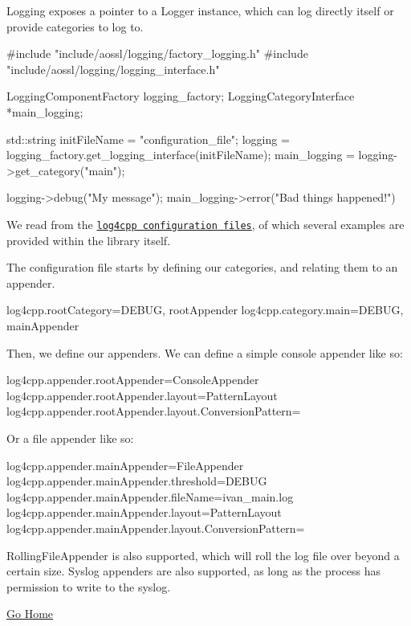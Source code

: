 Logging exposes a pointer to a Logger instance, which can log directly itself or provide categories to log to. \begin{DoxyVerb}#include "include/aossl/logging/factory_logging.h"
#include "include/aossl/logging/logging_interface.h"

LoggingComponentFactory logging_factory;
LoggingCategoryInterface *main_logging;

std::string initFileName = "configuration_file";
logging = logging_factory.get_logging_interface(initFileName);
main_logging = logging->get_category("main");

logging->debug("My message");
main_logging->error("Bad things happened!")
\end{DoxyVerb}


We read from the \href{http://log4cpp.sourceforge.net/api/classlog4cpp_1_1PropertyConfigurator.html}{\tt log4cpp configuration files}, of which several examples are provided within the library itself.

The configuration file starts by defining our categories, and relating them to an appender. \begin{DoxyVerb}log4cpp.rootCategory=DEBUG, rootAppender
log4cpp.category.main=DEBUG, mainAppender
\end{DoxyVerb}


Then, we define our appenders. We can define a simple console appender like so\+: \begin{DoxyVerb}log4cpp.appender.rootAppender=ConsoleAppender
log4cpp.appender.rootAppender.layout=PatternLayout
log4cpp.appender.rootAppender.layout.ConversionPattern=%
\end{DoxyVerb}


Or a file appender like so\+: \begin{DoxyVerb}log4cpp.appender.mainAppender=FileAppender
log4cpp.appender.mainAppender.threshold=DEBUG
log4cpp.appender.mainAppender.fileName=ivan_main.log
log4cpp.appender.mainAppender.layout=PatternLayout
log4cpp.appender.mainAppender.layout.ConversionPattern=%
\end{DoxyVerb}


Rolling\+File\+Appender is also supported, which will roll the log file over beyond a certain size. Syslog appenders are also supported, as long as the process has permission to write to the syslog.

\hyperlink{index}{Go Home} 